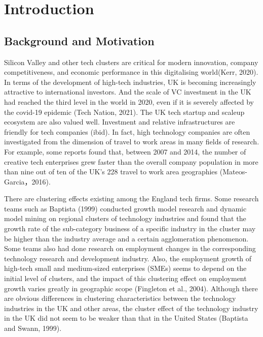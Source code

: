 \documentclass[
  12pt,
  oneside]{book}
\begin{document}
\hypertarget{intro}{%
\chapter{Introduction}\label{intro}}


\hypertarget{background-and-motivation}{%
\section{Background and Motivation}\label{background-and-motivation}}

Silicon Valley and other tech clusters are critical for modern innovation, company competitiveness, and economic performance in this digitalising world(Kerr, 2020). In terms of the development of high-tech industries, UK is becoming increasingly attractive to international investors. And the scale of VC investment in the UK had reached the third level in the world in 2020, even if it is severely affected by the covid-19 epidemic (Tech Nation, 2021). The UK tech startup and scaleup ecosystem are also valued well. Investment and relative infrastructures are friendly for tech companies (ibid). In fact, high technology companies are often investigated from the dimension of travel to work areas in many fields of research. For example, some reports found that, between 2007 and 2014, the number of creative tech enterprises grew faster than the overall company population in more than nine out of ten of the UK's 228 travel to work area geographies (Mateos-Garcia，2016).

There are clustering effects existing among the England tech firms. Some research teams such as Baptista (1999) conducted growth model research and dynamic model mining on regional clusters of technology industries and found that the growth rate of the sub-category business of a specific industry in the cluster may be higher than the industry average and a certain agglomeration phenomenon. Some teams also had done research on employment changes in the corresponding technology research and development industry. Also, the employment growth of high-tech small and medium-sized enterprises (SMEs) seems to depend on the initial level of clusters, and the impact of this clustering effect on employment growth varies greatly in geographic scope (Fingleton et al., 2004). Although there are obvious differences in clustering characteristics between the technology industries in the UK and other areas, the cluster effect of the technology industry in the UK did not seem to be weaker than that in the United States (Baptista and Swann, 1999).
\end{document}
